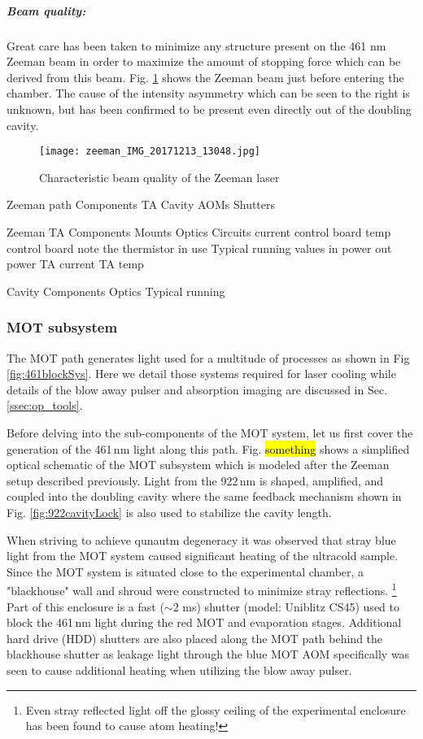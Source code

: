 \subparagraph{Beam quality:}
Great care has been taken to minimize any structure present on the 461 nm Zeeman beam in order to maximize the amount of stopping force which can be derived from this beam.
Fig. \ref{fig:461zeemanBeam} shows the Zeeman beam just before entering the chamber.
The cause of the intensity asymmetry which can be seen to the right is unknown, but has been confirmed to be present even directly out of the doubling cavity.
	\begin{figure}
		\centerline{
		\texttt{[image: zeeman\_IMG\_20171213\_13048.jpg]}}
		\caption{Characteristic beam quality of the Zeeman laser}
		\label{fig:461zeemanBeam}
	\end{figure}

Zeeman path
	Components
		TA
		Cavity
		AOMs
		Shutters
	
	Zeeman TA
		Components
			Mounts
			Optics
			Circuits
				current control board
				temp control board
					note the thermistor in use
		Typical running values
			in power
			out power
			TA current
			TA temp
		
	Cavity
		Components
			Optics
		Typical running
		
\subsubsection{MOT subsystem}

The MOT path generates light used for a multitude of processes as shown in Fig \ref{fig:461blockSys}.
Here we detail those systems required for laser cooling while details of the blow away pulser and absorption imaging are discussed in Sec. \ref{ssec:op_tools}.

Before delving into the sub-components of the MOT system, let us first cover the generation of the 461\,nm light along this path.
Fig. \hl{something} shows a simplified optical schematic of the MOT subsystem which is modeled after the Zeeman setup described previously.
Light from the 922\,nm is shaped, amplified, and coupled into the doubling cavity where the same feedback mechanism shown in Fig. \ref{fig:922cavityLock} is also used to stabilize the cavity length.

When striving to achieve qunautm degeneracy it was observed that stray blue light from the MOT system caused significant heating of the ultracold sample. 
Since the MOT system is situated close to the experimental chamber, a "blackhouse" wall and shroud were constructed to minimize stray reflections.
\footnote{Even stray reflected light off the glossy ceiling of the experimental enclosure has been found to cause atom heating!}
Part of this enclosure is a fast ($\sim$2 ms) shutter (model: Uniblitz CS45) used to block the 461\,nm light during the red MOT and evaporation stages.
Additional hard drive (HDD) shutters are also placed along the MOT path behind the blackhouse shutter as leakage light through the blue MOT AOM specifically was seen to cause additional heating when utilizing the blow away pulser.

